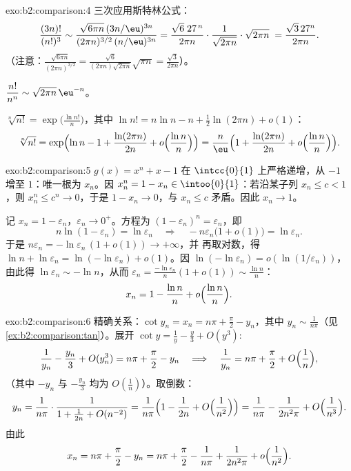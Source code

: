 \begin{solution}{exo:b2:comparison:4}
三次应用斯特林公式：
\[
\frac{(3n)!}{(n!)^3}
\sim \frac{\sqrt{6\pi n}\,(3n/\eu)^{3n}}
{(2\pi n)^{3/2}\,(n/\eu)^{3n}}
= \frac{\sqrt{6}\; 27^{\,n}}{2\pi n} \cdot
\frac{1}{\sqrt{2\pi n}}\cdot\sqrt{2\pi n}\;
= \frac{\sqrt3\,27^n}{2\pi n} .
\]
（注意：$\frac{\sqrt{6\pi n}}{(2\pi n)^{3/2}} =
\frac{\sqrt6}{(2\pi n)\sqrt{2\pi n}}\sqrt{\pi n} =
\frac{\sqrt3}{2\pi n}$）。

$\dfrac{n!}{n^n} \sim \sqrt{2\pi n}\,\eu^{-n}$。

$\sqrt[n]{n!} = \exp\bigl(\frac{\ln n!}{n}\bigr)$，其中 $\ln n! = n\ln
n - n + \frac12\ln(2\pi n) + o(1)$：
\[
\sqrt[n]{n!} = \exp\Bigl(\ln n - 1 + \frac{\ln(2\pi n)}{2n} +
o\Bigl(\frac{\ln n}{n}\Bigr)\Bigr)
= \frac{n}{\eu}\Bigl(1 + \frac{\ln(2\pi n)}{2n} +
o\Bigl(\frac{\ln n}{n}\Bigr)\Bigr).
\]
\end{solution}

\begin{solution}{exo:b2:comparison:5}
$g(x) = x^n + x - 1$ 在 $\intcc{0}{1}$ 上严格递增，从 $-1$
增至 $1$：唯一根为 $x_n$。因 $x_n^n = 1 - x_n \in
\intoo{0}{1}$：若沿某子列 $x_n \leq c < 1$，则 $x_n^n
\leq c^n \to 0$，于是 $1 - x_n \to 0$，与 $x_n \leq
c$ 矛盾。因此 $x_n \to 1$。

记 $x_n = 1 - \varepsilon_n$，$\varepsilon_n \to 0^+$。方程为
$(1 - \varepsilon_n)^n = \varepsilon_n$，即
\[
n\ln(1 - \varepsilon_n) = \ln \varepsilon_n
\quad\Longrightarrow\quad
-n\varepsilon_n\bigl(1 + o(1)\bigr) = \ln\varepsilon_n .
\]
于是 $n\varepsilon_n = -\ln\varepsilon_n\,(1 + o(1)) \to +\infty$，并
再取对数，得 $\ln n + \ln\varepsilon_n =
\ln(-\ln\varepsilon_n) + o(1)$。因 $\ln(-\ln \varepsilon_n) =
o(\ln(1/\varepsilon_n))$，由此得 $\ln\varepsilon_n \sim -\ln
n$，从而 $\varepsilon_n = \frac{-\ln\varepsilon_n}{n}(1 + o(1))
\sim \frac{\ln n}{n}$：
\[
x_n = 1 - \frac{\ln n}{n} + o\Bigl(\frac{\ln n}{n}\Bigr) .
\]
\end{solution}

\begin{solution}{exo:b2:comparison:6}
精确关系：$\cot y_n = x_n = n\pi + \frac\pi2 - y_n$，其中 $y_n
\sim \frac{1}{n\pi}$（见\cref{ex:b2:comparison:tan}）。展开 $\cot y
= \frac1y - \frac y3 + O(y^3)$:
\[
\frac{1}{y_n} - \frac{y_n}{3} + O(y_n^3) = n\pi + \frac\pi2 - y_n
\quad\Longrightarrow\quad
\frac{1}{y_n} = n\pi + \frac\pi2 + O\Bigl(\frac1n\Bigr),
\]
（其中 $-y_n$ 与 $-\frac{y_n}{3}$ 均为 $O(\frac1n)$）。取倒数：
\[
y_n = \frac{1}{n\pi}\cdot\frac{1}{1 + \frac{1}{2n} + O(n^{-2})}
= \frac{1}{n\pi}\Bigl(1 - \frac{1}{2n} + O\Bigl(\frac{1}{n^2}\Bigr)\Bigr)
= \frac{1}{n\pi} - \frac{1}{2n^2\pi} + O\Bigl(\frac{1}{n^3}\Bigr).
\]
由此
\[
x_n = n\pi + \frac{\pi}{2} - y_n
= n\pi + \frac\pi2 - \frac{1}{n\pi} + \frac{1}{2n^2\pi} +
o\Bigl(\frac{1}{n^2}\Bigr).
\]
\end{solution}

